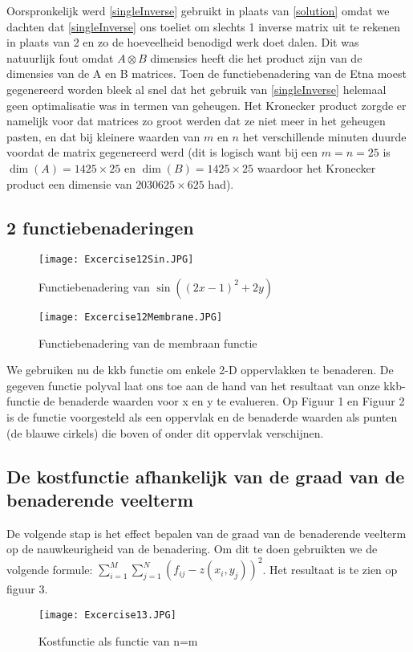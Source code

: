 \documentclass[a4paper]{article}
\begin{document}
Oorspronkelijk werd \eqref{singleInverse} gebruikt in plaats van \eqref{solution} omdat we dachten dat \eqref{singleInverse} ons toeliet om slechts 1 inverse matrix uit te rekenen in plaats van 2 en zo de hoeveelheid benodigd werk doet dalen. Dit was natuurlijk fout omdat $A\otimes B$ dimensies heeft die het product zijn van de dimensies van de A en B matrices. Toen de functiebenadering van de Etna moest gegenereerd worden bleek al snel dat het gebruik van \eqref{singleInverse} helemaal geen optimalisatie was in termen van geheugen. Het Kronecker product zorgde er namelijk voor dat matrices zo groot werden dat ze niet meer in het geheugen pasten, en dat bij kleinere waarden van $m$ en $n$ het verschillende minuten duurde voordat de matrix gegenereerd werd (dit is logisch want bij een $m = n = 25$ is $\dim(A) = 1425\times25$ en $\dim(B) = 1425\times25$ waardoor het Kronecker product een dimensie van $2030625\times625$ had).

\subsection{2 functiebenaderingen}
\begin{figure}
\caption{Functiebenadering van $\sin ((2x - 1)^{2} + 2y)$}
\texttt{[image: Excercise12Sin.JPG]}
\end{figure}
\begin{figure}
\caption{Functiebenadering van de membraan functie}
\texttt{[image: Excercise12Membrane.JPG]}
\end{figure}
We gebruiken nu de kkb functie om enkele 2-D oppervlakken te benaderen. De gegeven functie polyval laat ons toe aan de hand van het resultaat van onze kkb-functie de benaderde waarden voor x en y te evalueren. Op Figuur 1 en Figuur 2 is de functie voorgesteld als een oppervlak en de benaderde waarden als punten (de blauwe cirkels) die boven of onder dit oppervlak verschijnen.

\subsection{De kostfunctie afhankelijk van de graad van de benaderende veelterm}
De volgende stap is het effect bepalen van de graad van de benaderende veelterm op de nauwkeurigheid van de benadering. Om dit te doen gebruikten we de volgende formule: $\sum_{i=1}^{M}\sum_{j=1}^{N}(f_{ij}-z(x_{i},y_{j}))^{2}$. Het resultaat is te zien op figuur 3.
\begin{figure}
\caption{Kostfunctie als functie van n=m}
\texttt{[image: Excercise13.JPG]}
\end{figure}
\end{document}
